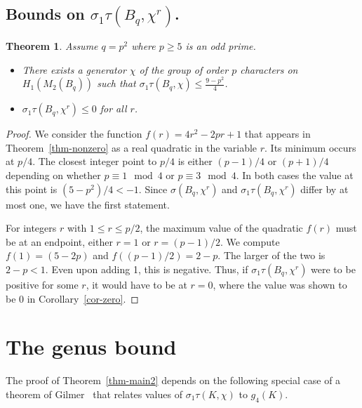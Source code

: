 \documentclass[10pt,oneside]{amsart}
\newtheorem{theorem}{Theorem}
\theoremstyle{definition}
\begin{document}
\subsection{Bounds on  $\sigma_1 \tau (B_q, \chi^r) $.}
\begin{theorem}\label{thm-boundscg} Assume $q = p^2$ where $p \ge 5$ is an odd   prime. %
\begin{itemize}

\item There exists a  generator  $\chi$ of the group of order $p$ characters on $H_1(M_2(B_q))$   such that $\sigma_1 \tau(B_q, \chi) \le   \frac{9 - p^2}{4}$.
\item  $\sigma_1 \tau (B_q,  \chi^r) \le 0 $ for all $r$.
\end{itemize}
\end{theorem}
\begin{proof}  We consider the function   $f(r)  = 4r^2 - 2pr +1$ that appears in Theorem~\ref{thm-nonzero}  as a real quadratic in the variable $r$.
Its minimum occurs at $p/4$.
The closest integer point to $p/4$ is either $(p-1)/4$ or $(p+1)/4 $ depending on whether $p \equiv 1 \mod 4$ or $  p \equiv  3 \mod4$.   In both cases the value at this  point is $(5 - p^2)/4 < -1$.  Since $\sigma(B_q, \chi^r)$ and $\sigma_1\tau(B_q, \chi^r)$ differ by at most one, we have the first statement.

For integers $r$ with  $ 1 \le r \le p/2$, the maximum value of the quadratic $f(r)$ must be at an endpoint, either $r=1$ or $r = (p-1)/2$.  We compute $f(1) = (5 - 2p)$ and $f((p-1)/2) = 2 - p$. The larger of the two is $2 -p <1$.  Even upon adding 1, this is negative.  Thus, if $\sigma_1 \tau(B_q, \chi^r)$ were to be positive for some $r$, it would have to be at $r = 0$, where the value was shown to be 0 in Corollary~\ref{cor-zero}.

\end{proof}

\section{The genus bound}

The proof of  Theorem~\ref{thm-main2}   depends on the following special case of a theorem of     Gilmer~\cite[Theorem 1]{MR656619} that relates  values of $\sigma_1\tau(K, \chi)$ to $g_4(K)$.
\end{document}
